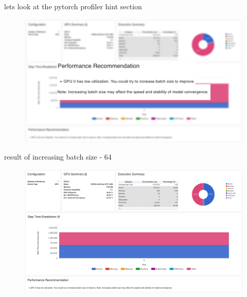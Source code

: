 \documentclass[compress,aspectratio=169]{beamer}
\begin{document}
\begin{frame}{lets look at the pytorch profiler hint section}

\begin{center}
    \begin{figure}
        \includegraphics[width=1\textwidth]{../../data/scap_gtx1080_profiler-torch_14615562_zoom}
    \end{figure}
\end{center}

\end{frame}

\begin{frame}{result of increasing batch size - 64}

\begin{center}
    \begin{figure}
        \includegraphics[width=1\textwidth]{../../data/scap_gtx1080_profiler-torch_batch-size-64_14629008}
    \end{figure}
    \end{center}

\end{frame}
\end{document}

